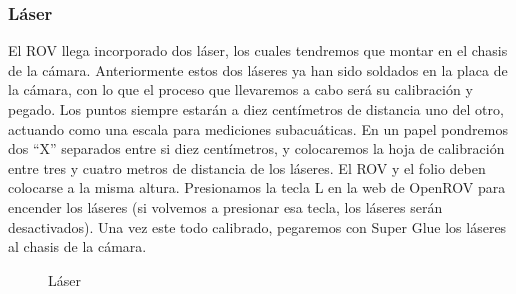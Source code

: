   \subsubsection{Láser}
  \label{subsubsec:laser}
El ROV llega incorporado dos láser, los cuales tendremos que montar en el chasis de la cámara. Anteriormente estos dos láseres ya han sido soldados en la placa de la cámara, con lo que el proceso que llevaremos a cabo será su calibración y pegado.
Los puntos siempre estarán a diez centímetros de distancia uno del otro, actuando como una escala para mediciones subacuáticas.
En un papel pondremos dos “X” separados entre si diez centímetros, y colocaremos la hoja de calibración entre tres y cuatro metros de distancia de los láseres. El ROV y el folio deben colocarse a la misma altura.
Presionamos la tecla L en la web de OpenROV para encender los láseres (si volvemos a presionar esa tecla, los láseres serán desactivados).
Una vez este todo calibrado,  pegaremos con Super Glue los láseres al chasis de la cámara.
 \begin{figure}[hbtp]
  \begin{center}
  \end{center}
  \caption{Láser}
  \label{fig:laser}
\end{figure}
  
